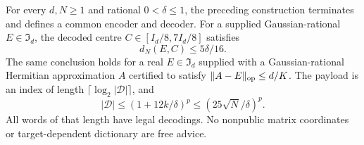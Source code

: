 \begin{theorem}
\label{thm:interiorcodec79}
For every $d,N\ge1$ and rational $0<\delta\le1$, the preceding
construction terminates and defines a common encoder and decoder.
For a supplied Gaussian-rational $E\in\mathfrak I_d$, the decoded
centre $C\in[I_d/8,7I_d/8]$ satisfies
\begin{equation}\label{eq:interiorcodeerror79}
 d_N(E,C)\le5\delta/16.
\end{equation}
The same conclusion holds for a real $E\in\mathfrak I_d$ supplied
with a Gaussian-rational Hermitian approximation $A$ certified to
satisfy $\|A-E\|_{\rm op}\le d/K$.  The payload is an index of
length $\lceil\log_2|\mathcal D|\rceil$, and
\begin{equation}\label{eq:interiorcodesize79}
 |\mathcal D|\le(1+12k/\delta)^p
                  \le(25\sqrt N/\delta)^p.
\end{equation}
All words of that length have legal decodings.  No nonpublic
matrix coordinates or target-dependent dictionary are free advice.
\end{theorem}
